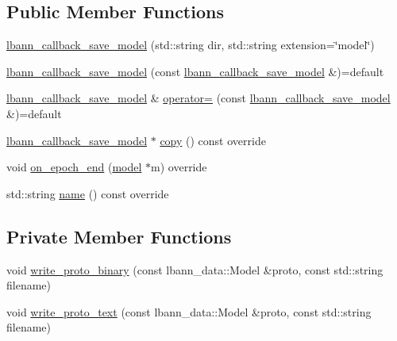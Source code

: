 \subsection*{Public Member Functions}
\begin{DoxyCompactItemize}
\item 
\hyperlink{classlbann_1_1lbann__callback__save__model_a603d5e3c418ddc29724664eeff401707}{lbann\+\_\+callback\+\_\+save\+\_\+model} (std\+::string dir, std\+::string extension=\char`\"{}model\char`\"{})
\item 
\hyperlink{classlbann_1_1lbann__callback__save__model_ab5c646c34145f0d5d07608e709495f39}{lbann\+\_\+callback\+\_\+save\+\_\+model} (const \hyperlink{classlbann_1_1lbann__callback__save__model}{lbann\+\_\+callback\+\_\+save\+\_\+model} \&)=default
\item 
\hyperlink{classlbann_1_1lbann__callback__save__model}{lbann\+\_\+callback\+\_\+save\+\_\+model} \& \hyperlink{classlbann_1_1lbann__callback__save__model_a606ca0b8144e6cedc96311d9e74c04b7}{operator=} (const \hyperlink{classlbann_1_1lbann__callback__save__model}{lbann\+\_\+callback\+\_\+save\+\_\+model} \&)=default
\item 
\hyperlink{classlbann_1_1lbann__callback__save__model}{lbann\+\_\+callback\+\_\+save\+\_\+model} $\ast$ \hyperlink{classlbann_1_1lbann__callback__save__model_adaebfea30dcc1c32a8ae25a3307abb7f}{copy} () const override
\item 
void \hyperlink{classlbann_1_1lbann__callback__save__model_ae047ee35b65e9bda4080a83833612699}{on\+\_\+epoch\+\_\+end} (\hyperlink{classlbann_1_1model}{model} $\ast$m) override
\item 
std\+::string \hyperlink{classlbann_1_1lbann__callback__save__model_a85b88992e7cd7073279b8a9b6d8b142f}{name} () const override
\end{DoxyCompactItemize}
\subsection*{Private Member Functions}
\begin{DoxyCompactItemize}
\item 
void \hyperlink{classlbann_1_1lbann__callback__save__model_a3c06fcc91890d4fe51a07672152b91a5}{write\+\_\+proto\+\_\+binary} (const lbann\+\_\+data\+::\+Model \&proto, const std\+::string filename)
\item 
void \hyperlink{classlbann_1_1lbann__callback__save__model_a9dd2617a12810287c4f5cb87746e71ea}{write\+\_\+proto\+\_\+text} (const lbann\+\_\+data\+::\+Model \&proto, const std\+::string filename)
\end{DoxyCompactItemize}
